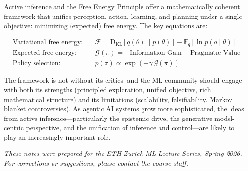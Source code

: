 \documentclass[11pt,a4paper]{article}
\theoremstyle{definition}
\newcommand{\KL}{\mathrm{D}_{\mathrm{KL}}}
\newcommand{\E}{\mathbb{E}}
\newcommand{\cF}{\mathcal{F}}
\newcommand{\cG}{\mathcal{G}}
\begin{document}
Active inference and the Free Energy Principle offer a mathematically coherent
framework that unifies perception, action, learning, and planning under a
single objective: minimizing (expected) free energy.  The key equations are:

\begin{align}
  \text{Variational free energy:} \quad
  & \cF = \KL[q(\theta) \| p(\theta)] - \E_q[\ln p(o \mid \theta)]
  \tag{Complexity $-$ Accuracy} \\[6pt]
  \text{Expected free energy:} \quad
  & \cG(\pi) = -\text{Information Gain} - \text{Pragmatic Value}
  \tag{Exploration $+$ Exploitation} \\[6pt]
  \text{Policy selection:} \quad
  & p(\pi) \propto \exp(-\gamma\, \cG(\pi))
  \tag{Softmax policy}
\end{align}

The framework is not without its critics, and the ML community should engage
with both its strengths (principled exploration, unified objective, rich
mathematical structure) and its limitations (scalability, falsifiability,
Markov blanket controversies).  As agentic AI systems grow more sophisticated,
the ideas from active inference---particularly the epistemic drive, the
generative model-centric perspective, and the unification of inference and
control---are likely to play an increasingly important role.

\vfill
\begin{center}
\small
\textit{These notes were prepared for the ETH Zurich ML Lecture Series, Spring 2026.}\\
\textit{For corrections or suggestions, please contact the course staff.}
\end{center}
\end{document}
